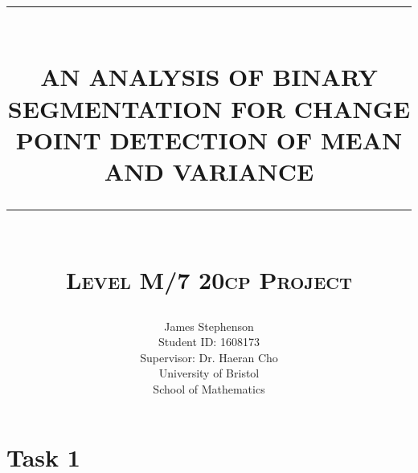 \documentclass{article}
\newcommand{\HRule}[1]{\rule{\linewidth}{#1}}
\begin{document}
	\title{
	\HRule{0.5pt} \\
	\LARGE \textbf{\uppercase{An Analysis of Binary Segmentation for change point detection of mean and variance}}
	\HRule{2pt} \\ [0.5cm]
	\normalsize \textsc{ Level M/7 20cp Project} \vspace*{5\baselineskip}\\ [4cm]}
	\author{
		James Stephenson \\
		Student ID: 1608173\\
		Supervisor: Dr. Haeran Cho \\ 
		University of Bristol \\
		School of Mathematics }
	\maketitle \newpage 
		
	\tableofcontents
	\newpage
	
	\section{Task 1}
	 

	\newpage
		
	
\end{document}
